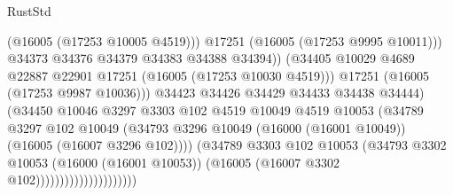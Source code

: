 \begin{lexlean}{RustStd}
\begin{coremodule}
                                                (@16005 (@17253 @10005 @4519)))
                                              @17251
                                              (@16005 (@17253 @9995 @10011)))
                                            @34373
                                            @34376
                                            @34379
                                            @34383
                                            @34388
                                            @34394))
                                        (@34405
                                          @10029
                                          @4689
                                          @22887
                                          @22901
                                          @17251
                                          (@16005 (@17253 @10030 @4519)))
                                        @17251
                                        (@16005 (@17253 @9987 @10036)))
                                      @34423
                                      @34426
                                      @34429
                                      @34433
                                      @34438
                                      @34444)
                                    (@34450
                                      @10046
                                      @3297
                                      @3303
                                      @102
                                      @4519
                                      @10049
                                      @4519
                                      @10053
                                      (@34789
                                        @3297
                                        @102
                                        @10049
                                        (@34793
                                          @3296
                                          @10049
                                          (@16000 (@16001 @10049))
                                          (@16005 (@16007 @3296 @102))))
                                      (@34789
                                        @3303
                                        @102
                                        @10053
                                        (@34793
                                          @3302
                                          @10053
                                          (@16000 (@16001 @10053))
                                          (@16005 (@16007 @3302 @102)))))))))))))))))))))

\end{coremodule}
\end{lexlean}
